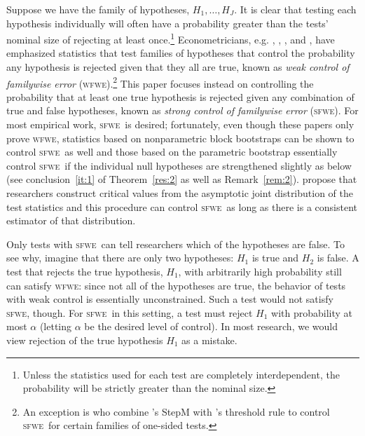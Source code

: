 \documentclass[11pt,fleqn]{article}
\newcommand\citepos[2][]{\citeauthor{#2}'s \citeyearpar[#1]{#2}}
\theoremstyle{definition}
\newcommand{\sfwe}{\textsc{sfwe}}
\newcommand{\wfwe}{\textsc{wfwe}}
\begin{document}
Suppose we have the family of hypotheses, $H_1,\dots,H_J$.  It is
clear that testing each hypothesis individually will often have a
probability greater than the tests' nominal size of rejecting at least
once.\footnote{Unless the statistics used for each test are completely
  interdependent, the probability will be strictly greater than the
  nominal size.}  Econometricians, e.g. \citet{Whi:00},
\citet{Han:05}, \cite{HuW:10}, and \citet{ClM:12b}, have emphasized
statistics that test families of hypotheses that control the
probability any hypothesis is rejected given that they all are true,
known as \textit{weak control of familywise error}
(\wfwe).\footnote{An exception is \citet{HHK:10} who combine
  \citepos{RoW:05} StepM with \citepos{Han:05} threshold rule to
  control \sfwe\ for certain families of one-sided tests.}  This paper
focuses instead on controlling the probability that at least one true
hypothesis is rejected given any combination of true and false
hypotheses, known as \textit{strong control of familywise error}
(\sfwe).  For most empirical work, \sfwe\ is desired; fortunately,
even though these papers only prove \wfwe, statistics based on
nonparametric block bootstraps \citep{Whi:00,Han:05} can be shown to
control \sfwe\ as well \citep[this follows directly from][]{RoW:05}
and those based on the parametric bootstrap \citep{ClM:12b} essentially
control \sfwe\ if the individual null hypotheses are strengthened
slightly as below (see conclusion~\ref{it:1} of Theorem~\ref{res:2} as
well as Remark~\ref{rem:2}).  \citet{HuW:10} propose that researchers
construct critical values from the asymptotic joint distribution of
the test statistics and this procedure can control \sfwe\ as long as there is a
consistent estimator of that distribution.

Only tests with \sfwe\ can tell researchers which of the hypotheses
are false.  To see why, imagine that there are only two hypotheses:
$H_1$ is true and $H_2$ is false.  A test that rejects the true
hypothesis, $H_1$, with arbitrarily high probability still can satisfy
\wfwe: since not all of the hypotheses are true, the behavior of tests
with weak control is essentially unconstrained.  Such a test would not
satisfy \sfwe, though.  For \sfwe\ in this setting, a test must reject
$H_1$ with probability at most $\alpha$ (letting $\alpha$ be the
desired level of control).  In most research, we would view rejection
of the true hypothesis $H_1$ as a mistake.
\end{document}
